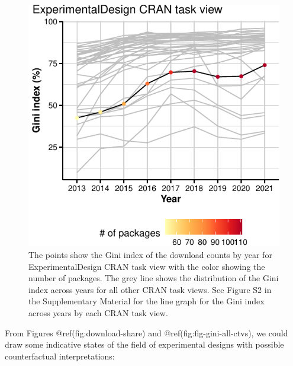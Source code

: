 \documentclass{article}
\begin{document}
\begin{figure}[htbp]

{\centering \includegraphics{figures/fig-gini-all-ctvs-1} 

}

\caption{The points show the Gini index of the download counts by year for ExperimentalDesign CRAN task view with the color showing the number of packages. The grey line shows the distribution of the Gini index across years for all other CRAN task views. See Figure S2 in the Supplementary Material for the line graph for the Gini index across years by each CRAN task view.}\label{fig:fig-gini-all-ctvs}
\end{figure}

From Figures @ref(fig:download-share) and @ref(fig:fig-gini-all-ctvs),
we could draw some indicative states of the field of experimental
designs with possible counterfactual interpretations:
\end{document}
